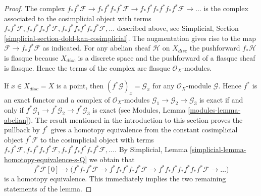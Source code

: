 \documentclass[10pt,a4paper]{amsart}
\theoremstyle{plain}
\theoremstyle{definition}
\theoremstyle{remark}
\numberwithin{equation}{subsection}
\begin{document}
\begin{proof}
The complex $f_*f^*\mathcal{F} \to  f_*f^*f_*f^*\mathcal{F} \to
f_*f^*f_*f^*f_*f^*\mathcal{F} \to \ldots$ is the complex associated
to the cosimplicial object with terms
$f_*f^*\mathcal{F}, f_*f^*f_*f^*\mathcal{F},
f_*f^*f_*f^*f_*f^*\mathcal{F}, \ldots$ described above, see
Simplicial, Section \ref{simplicial-section-dold-kan-cosimplicial}.
The augmentation gives rise to the map $\mathcal{F} \to f_*f^*\mathcal{F}$
as indicated. For any abelian sheaf $\mathcal{H}$ on $X_{disc}$ the
pushforward $f_*\mathcal{H}$ is flasque because $X_{disc}$
is a discrete space and the pushforward of a flasque sheaf is flasque.
Hence the terms of the complex are flasque $\mathcal{O}_X$-modules.

\medskip\noindent
If $x \in X_{disc} = X$ is a point, then $(f^*\mathcal{G})_x = \mathcal{G}_x$
for any $\mathcal{O}_X$-module $\mathcal{G}$. Hence $f^*$ is an exact functor
and a complex of $\mathcal{O}_X$-modules
$\mathcal{G}_1 \to \mathcal{G}_2 \to \mathcal{G}_3$
is exact if and only if
$f^*\mathcal{G}_1 \to f^*\mathcal{G}_2 \to f^*\mathcal{G}_3$
is exact (see Modules, Lemma \ref{modules-lemma-abelian}).
The result mentioned in the introduction to this section
proves the pullback by $f^*$ gives a homotopy equivalence from
the constant cosimplicial object $f^*\mathcal{F}$ to the
cosimplicial object with terms
$f_*f^*\mathcal{F}, f_*f^*f_*f^*\mathcal{F},
f_*f^*f_*f^*f_*f^*\mathcal{F}, \ldots$.
By Simplicial, Lemma \ref{simplicial-lemma-homotopy-equivalence-s-Q}
we obtain that
$$
f^*\mathcal{F}[0] \to \Big(
f^*f_*f^*\mathcal{F} \to
f^*f_*f^*f_*f^*\mathcal{F} \to
f^*f_*f^*f_*f^*f_*f^*\mathcal{F} \to \ldots
\Big)
$$
is a homotopy equivalence. This immediately implies the two remaining
statements of the lemma.
\end{proof}
\end{document}
